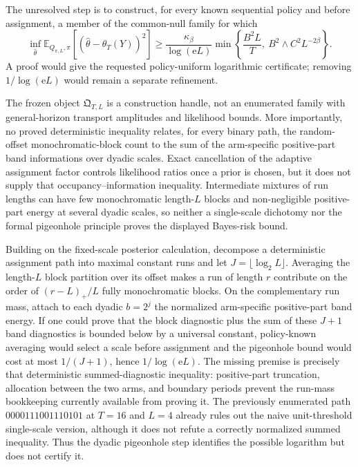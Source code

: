 The unresolved step is to construct, for every known sequential policy and before assignment, a member of the common-null family for which
\[
 \inf_{\widehat\theta}
 \mathbb E_{Q_{\pi,L},\pi}
 \left[(\widehat\theta-\theta_T(Y))^2\right]
 \ge
 \frac{\kappa_\beta}{\log(\mathrm eL)}
 \min\left\{\frac{B^2L}{T},\ B^2\wedge C^2L^{-2\beta}\right\}.
\]
A proof would give the requested policy-uniform logarithmic certificate; removing \(1/\log(\mathrm eL)\) would remain a separate refinement.

The frozen object \(\mathfrak Q_{T,L}\) is a construction handle, not an enumerated family with general-horizon transport amplitudes and likelihood bounds.  More importantly, no proved deterministic inequality relates, for every binary path, the random-offset monochromatic-block count to the sum of the arm-specific positive-part band informations over dyadic scales.  Exact cancellation of the adaptive assignment factor controls likelihood ratios once a prior is chosen, but it does not supply that occupancy--information inequality.  Intermediate mixtures of run lengths can have few monochromatic length-\(L\) blocks and non-negligible positive-part energy at several dyadic scales, so neither a single-scale dichotomy nor the formal pigeonhole principle proves the displayed Bayes-risk bound.

Building on the fixed-scale posterior calculation, decompose a deterministic assignment path into maximal constant runs and let \(J=\lfloor\log_2L\rfloor\).  Averaging the length-\(L\) block partition over its offset makes a run of length \(r\) contribute on the order of \((r-L)_+/L\) fully monochromatic blocks.  On the complementary run mass, attach to each dyadic \(b=2^j\) the normalized arm-specific positive-part band energy.  If one could prove that the block diagnostic plus the sum of these \(J+1\) band diagnostics is bounded below by a universal constant, policy-known averaging would select a scale before assignment and the pigeonhole bound would cost at most \(1/(J+1)\), hence \(1/\log(\mathrm eL)\).  The missing premise is precisely that deterministic summed-diagnostic inequality: positive-part truncation, allocation between the two arms, and boundary periods prevent the run-mass bookkeeping currently available from proving it.  The previously enumerated path \(0000111001110101\) at \(T=16\) and \(L=4\) already rules out the naive unit-threshold single-scale version, although it does not refute a correctly normalized summed inequality.  Thus the dyadic pigeonhole step identifies the possible logarithm but does not certify it.

